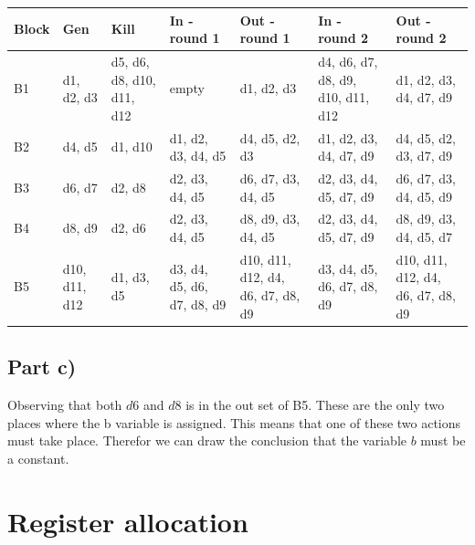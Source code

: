 \documentclass[paper=a4, fontsize=11pt]{scrartcl} %
\numberwithin{equation}{section} %
\numberwithin{figure}{section} %
\numberwithin{table}{section} %
\begin{document}
\begin{table}[ht!]
    \begin{tabular}{|p{1cm}|p{2cm}|p{2cm}|p{2cm}|p{2.1cm}|p{2cm}|p{2.1cm}|}
    \hline
    Block & Gen           & Kill                      & In - round 1               & Out - round 1                     & In - round 2                      & Out - round 2                     \\ \hline
    B1    & d1, d2, d3    & d5, d6, d8, d10, d11, d12 & empty                      & d1, d2, d3                        & d4, d6, d7, d8, d9, d10, d11, d12 & d1, d2, d3, d4, d7, d9            \\ \hline
    B2    & d4, d5        & d1, d10                   & d1, d2, d3, d4, d5         & d4, d5, d2, d3                    & d1, d2, d3, d4, d7, d9            & d4, d5, d2, d3, d7, d9            \\ \hline
    B3    & d6, d7        & d2, d8                    & d2, d3, d4, d5             & d6, d7, d3, d4, d5                & d2, d3, d4, d5, d7, d9            & d6, d7, d3, d4, d5, d9            \\ \hline
    B4    & d8, d9        & d2, d6                    & d2, d3, d4, d5             & d8, d9, d3, d4, d5                & d2, d3, d4, d5, d7, d9            & d8, d9, d3, d4, d5, d7            \\ \hline
    B5    & d10, d11, d12 & d1, d3, d5                & d3, d4, d5, d6, d7, d8, d9 & d10, d11, d12, d4, d6, d7, d8, d9 & d3, d4, d5, d6, d7, d8, d9        & d10, d11, d12, d4, d6, d7, d8, d9 \\ \hline
    \end{tabular}
\end{table}
\subsection{Part c)}
Observing that both $d6$ and $d8$ is in the out set of B5.
These are the only two places where the b variable is assigned.
This means that one of these two actions must take place.
Therefor we can draw the conclusion that the variable $b$ must be a constant.

\section{Register allocation}
\end{document}
